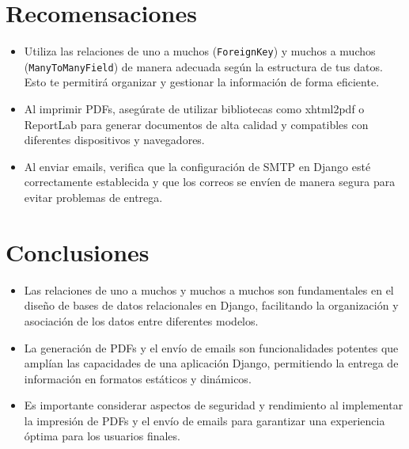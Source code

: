 \documentclass{article}
\begin{document}
  \section{Recomensaciones}
  \begin{itemize}
    \item Utiliza las relaciones de uno a muchos (\texttt{ForeignKey}) y muchos a muchos (\texttt{ManyToManyField}) de manera adecuada según la estructura de tus datos. Esto te permitirá organizar y gestionar la información de forma eficiente.
    \item Al imprimir PDFs, asegúrate de utilizar bibliotecas como xhtml2pdf o ReportLab para generar documentos de alta calidad y compatibles con diferentes dispositivos y navegadores.
    \item Al enviar emails, verifica que la configuración de SMTP en Django esté correctamente establecida y que los correos se envíen de manera segura para evitar problemas de entrega.
  \end{itemize}


  \section{Conclusiones}
  \begin{itemize}
    \item Las relaciones de uno a muchos y muchos a muchos son fundamentales en el diseño de bases de datos relacionales en Django, facilitando la organización y asociación de los datos entre diferentes modelos.
    \item La generación de PDFs y el envío de emails son funcionalidades potentes que amplían las capacidades de una aplicación Django, permitiendo la entrega de información en formatos estáticos y dinámicos.
    \item Es importante considerar aspectos de seguridad y rendimiento al implementar la impresión de PDFs y el envío de emails para garantizar una experiencia óptima para los usuarios finales.
  \end{itemize}

	\newpage
\end{document}
